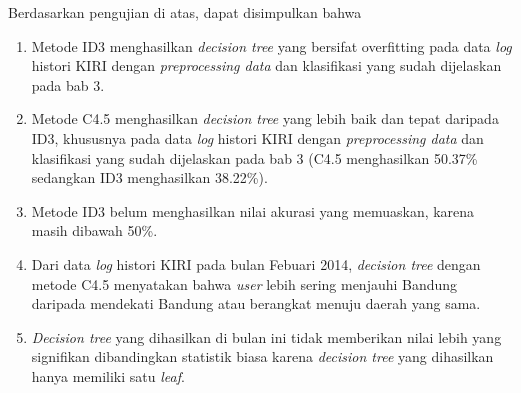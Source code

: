 Berdasarkan pengujian di atas, dapat disimpulkan bahwa 

\begin{enumerate}
	\item Metode ID3 menghasilkan \textsl{decision tree} yang bersifat overfitting pada data \textsl{log} histori KIRI dengan  \textsl{preprocessing data} dan klasifikasi yang sudah dijelaskan pada bab 3.
	\item Metode C4.5 menghasilkan \textsl{decision tree} yang lebih baik dan tepat daripada ID3, khususnya pada data \textsl{log} histori KIRI dengan \textsl{preprocessing data} dan klasifikasi yang sudah dijelaskan pada bab 3 (C4.5 menghasilkan 50.37\% sedangkan ID3 menghasilkan 38.22\%).
	\item Metode ID3 belum menghasilkan nilai akurasi yang memuaskan, karena masih dibawah 50\%.
	\item Dari data \textsl{log} histori KIRI pada bulan Febuari 2014, \textsl{decision tree} dengan metode C4.5 menyatakan bahwa \textsl{user} lebih sering menjauhi Bandung daripada mendekati Bandung atau berangkat menuju daerah yang sama.
	\item \textsl{Decision tree} yang dihasilkan di bulan ini tidak memberikan nilai lebih yang signifikan dibandingkan statistik biasa karena \textsl{decision tree} yang dihasilkan hanya memiliki satu \textsl{leaf}.
\end{enumerate}













